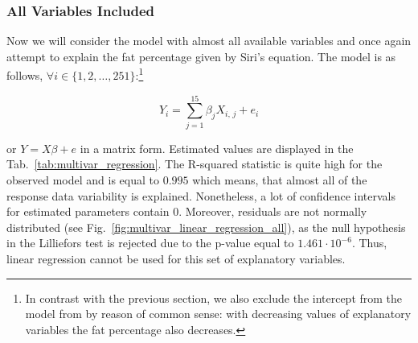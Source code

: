 \documentclass[11pt,american,american]{article}
\begin{document}
\subsubsection{All Variables Included}

Now we will consider the model with almost all available variables and once again attempt to explain the fat percentage given by Siri's equation. The model is as follows, $\forall i \in \{1,2, \dots, 251\}$:\footnote{In contrast with the previous section, we also exclude the intercept from the model from by reason of common sense: with decreasing values of explanatory variables the fat percentage also decreases.}

\begin{equation}
	Y_{i} = \sum_{j = 1}^{15}\beta_{j} X_{i,\,j} + e_{i}
\end{equation}

\medskip
\noindent
or $Y = X \beta + e$ in a matrix form. Estimated values are displayed in the Tab.~\ref{tab:multivar_regression}. The R-squared statistic is quite high for the observed model and is equal to $0.995$ which means, that almost all of the response data variability is explained. Nonetheless, a lot of confidence intervals for estimated parameters contain $0$. Moreover, residuals are not normally distributed (see Fig.~\ref{fig:multivar_linear_regression_all}), as the null hypothesis in the Lilliefors test is rejected due to the p-value equal to $1.461 \cdot 10^{-6}$. Thus, linear regression cannot be used for this set of explanatory variables.
\end{document}
